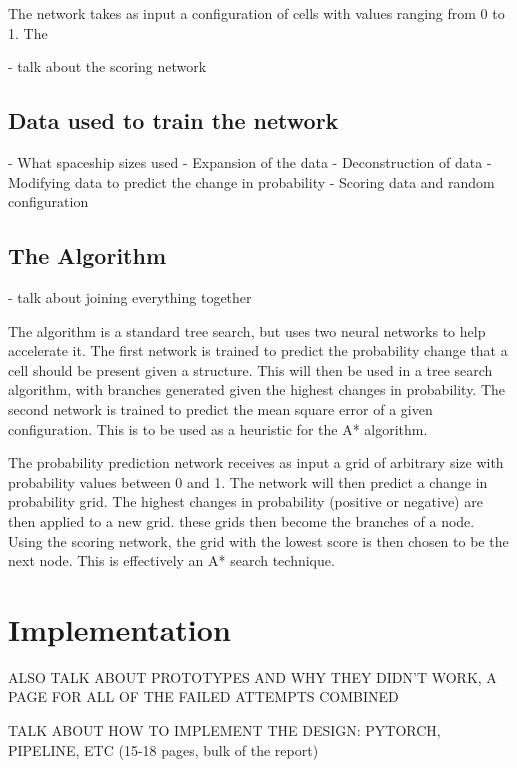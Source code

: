 \documentclass{l4proj}
\begin{document}
The network takes as input a configuration of cells with values ranging from 0 to 1. The 

- talk about the scoring network

\section{Data used to train the network}
- What spaceship sizes used
- Expansion of the data
- Deconstruction of data
- Modifying data to predict the change in probability
- Scoring data and random configuration


\section{The Algorithm}

- talk about joining everything together

The algorithm is a standard tree search, but uses two neural networks to help accelerate it. The first network is trained to predict the probability change that a cell should be present given a structure. This will then be used in a tree search algorithm, with branches generated given the highest changes in probability. The second network is trained to predict the mean square error of a given configuration. This is to be used as a heuristic for the A* algorithm.

The probability prediction network receives as input a grid of arbitrary size with probability values between 0 and 1. The network will then predict a change in probability grid. The highest changes in probability (positive or negative) are then applied to a new grid. these grids then become the branches of a node. Using the scoring network, the grid with the lowest score is then chosen to be the next node. This is effectively an A* search technique.


\chapter{Implementation}

ALSO TALK ABOUT PROTOTYPES AND WHY THEY DIDN'T WORK, A PAGE FOR ALL OF THE FAILED ATTEMPTS COMBINED

TALK ABOUT HOW TO IMPLEMENT THE DESIGN: PYTORCH, PIPELINE, ETC (15-18 pages, bulk of the report)
\end{document}
